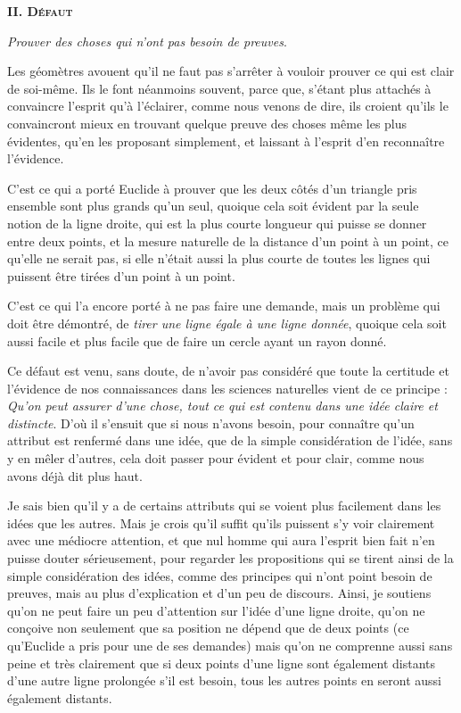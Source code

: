 \begin{center}{\bfseries\scshape II. Défaut}\end{center}

	\emph{Prouver des choses qui n'ont pas besoin de preuves}.

Les géomètres avouent qu'il ne faut pas s'arrêter à vouloir prouver ce qui est clair de soi-même. Ils le font néanmoins souvent, parce que, s'étant plus attachés à convaincre l'esprit qu'à l'éclairer, comme nous venons de dire, ils croient qu'ils le convaincront mieux en trouvant quelque preuve des choses même les plus évidentes, qu'en les proposant simplement, et laissant à l'esprit d'en reconnaître l'évidence.

C'est ce qui a porté Euclide à prouver que les deux côtés d'un triangle pris ensemble sont plus grands qu'un seul, quoique cela soit évident par la seule notion de la ligne droite, qui est la plus courte longueur qui puisse se donner entre deux points, et la mesure naturelle de la distance d'un point à un point, ce qu'elle ne serait pas, si elle n'était aussi la plus courte de toutes les lignes qui puissent être tirées d'un point à un point.

C'est ce qui l'a encore porté à ne pas faire une demande, mais un problème qui doit être démontré, de \emph{tirer une ligne égale à une ligne donnée}, quoique cela soit aussi facile et plus facile que de faire un cercle ayant un rayon donné.

Ce défaut est venu, sans doute, de n'avoir pas considéré que toute la certitude et l'évidence de nos connaissances dans les sciences naturelles vient de ce principe : \emph{Qu'on peut assurer d'une chose, tout ce qui est contenu dans une idée claire et distincte}. D'où il s'ensuit que si nous n'avons besoin, pour connaître qu'un attribut est renfermé dans une idée, que de la simple considération de l'idée, sans y en mêler d'autres, cela doit passer pour évident et pour clair, comme nous avons déjà dit plus haut.

Je sais bien qu'il y a de certains attributs qui se voient plus facilement dans les idées que les autres. Mais je crois qu'il suffit qu'ils puissent s'y voir clairement avec une médiocre attention, et que nul homme qui aura l'esprit bien fait n'en puisse douter sérieusement, pour regarder les propositions qui se tirent ainsi de la simple considération des idées, comme des principes qui n'ont point besoin de preuves, mais au plus d'explication et d'un peu de discours. Ainsi, je soutiens qu'on ne peut faire un peu d'attention sur l'idée d'une ligne droite, qu'on ne conçoive non seulement que sa position ne dépend que de deux points (ce qu'Euclide a pris pour une de ses demandes) mais qu'on ne comprenne aussi sans peine et très clairement que si deux points d'une ligne sont également distants d'une autre ligne prolongée s'il est besoin, tous les autres points en seront aussi également distants.

